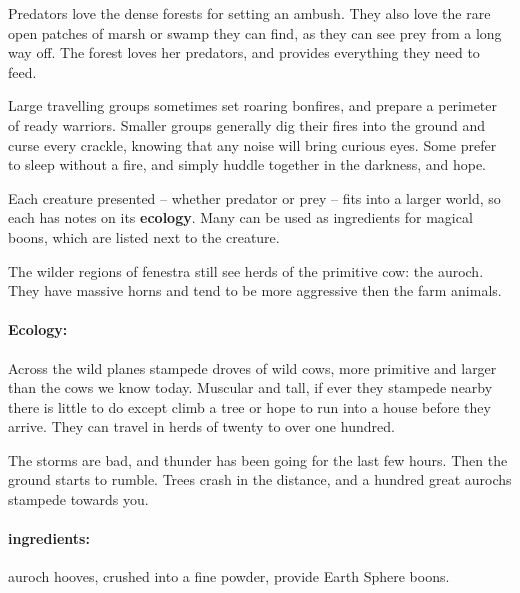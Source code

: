 \begin{multicols}{2}

\noindent
Predators love the dense forests for setting an ambush.
They also love the rare open patches of marsh or swamp they can find, as they can see prey from a long way off.
The forest loves her predators, and provides everything they need to feed.

Large travelling groups sometimes set roaring bonfires, and prepare a perimeter of ready warriors.
Smaller groups generally dig their fires into the ground and curse every crackle, knowing that any noise will bring curious eyes.
Some prefer to sleep without a fire, and simply huddle together in the darkness, and hope.

Each creature presented -- whether predator or prey -- fits into a larger world, so each has notes on its \textbf{ecology}.
Many can be used as \glspl{ingredient} for magical \glspl{boon}, which are listed next to the creature.

\label{auroch}

The wilder regions of \gls{fenestra} still see herds of the primitive cow: the auroch.
They have massive horns and tend to be more aggressive then the farm animals.


\paragraph{Ecology:} Across the wild planes stampede droves of wild cows, more primitive and larger than the cows we know today.
Muscular and tall, if ever they stampede nearby there is little to do except climb a tree or hope to run into a house before they arrive.
They can travel in herds of twenty to over one hundred.

\begin{boxtext}

  The storms are bad, and thunder has been going for the last few hours.  Then the ground starts to rumble.  Trees crash in the distance, and a hundred great aurochs stampede towards you.

\end{boxtext}

\paragraph{\Glspl{ingredient}:}
auroch hooves, crushed into a fine powder, provide Earth Sphere \glspl{boon}.


\end{multicols}

